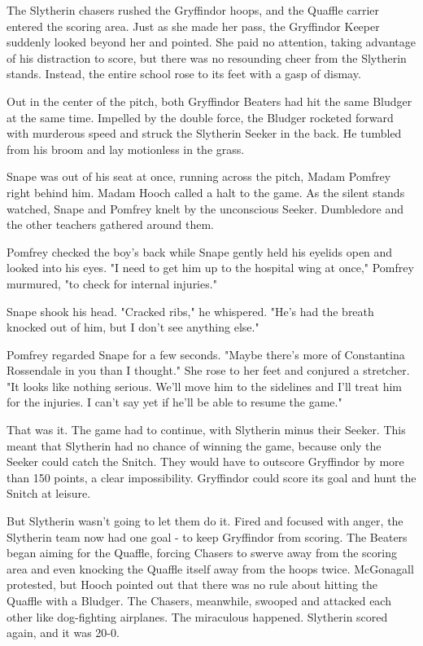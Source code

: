 \documentclass[a4paper,11pt]{article}
\begin{document}
The Slytherin chasers rushed the Gryffindor hoops, and the Quaffle carrier entered the scoring area. Just as she made her pass, the Gryffindor Keeper suddenly looked beyond her and pointed. She paid no attention, taking advantage of his distraction to score, but there was no resounding cheer from the Slytherin stands. Instead, the entire school rose to its feet with a gasp of dismay.

Out in the center of the pitch, both Gryffindor Beaters had hit the same Bludger at the same time. Impelled by the double force, the Bludger rocketed forward with murderous speed and struck the Slytherin Seeker in the back. He tumbled from his broom and lay motionless in the grass.

Snape was out of his seat at once, running across the pitch, Madam Pomfrey right behind him. Madam Hooch called a halt to the game. As the silent stands watched, Snape and Pomfrey knelt by the unconscious Seeker. Dumbledore and the other teachers gathered around them.

Pomfrey checked the boy's back while Snape gently held his eyelids open and looked into his eyes. "I need to get him up to the hospital wing at once," Pomfrey murmured, "to check for internal injuries."

Snape shook his head. "Cracked ribs," he whispered. "He's had the breath knocked out of him, but I don't see anything else."

Pomfrey regarded Snape for a few seconds. "Maybe there's more of Constantina Rossendale in you than I thought." She rose to her feet and conjured a stretcher. "It looks like nothing serious. We'll move him to the sidelines and I'll treat him for the injuries. I can't say yet if he'll be able to resume the game."

That was it. The game had to continue, with Slytherin minus their Seeker. This meant that Slytherin had no chance of winning the game, because only the Seeker could catch the Snitch. They would have to outscore Gryffindor by more than 150 points, a clear impossibility. Gryffindor could score its goal and hunt the Snitch at leisure.

But Slytherin wasn't going to let them do it. Fired and focused with anger, the Slytherin team now had one goal - to keep Gryffindor from scoring. The Beaters began aiming for the Quaffle, forcing Chasers to swerve away from the scoring area and even knocking the Quaffle itself away from the hoops twice. McGonagall protested, but Hooch pointed out that there was no rule about hitting the Quaffle with a Bludger. The Chasers, meanwhile, swooped and attacked each other like dog-fighting airplanes. The miraculous happened. Slytherin scored again, and it was 20-0.
\end{document}
